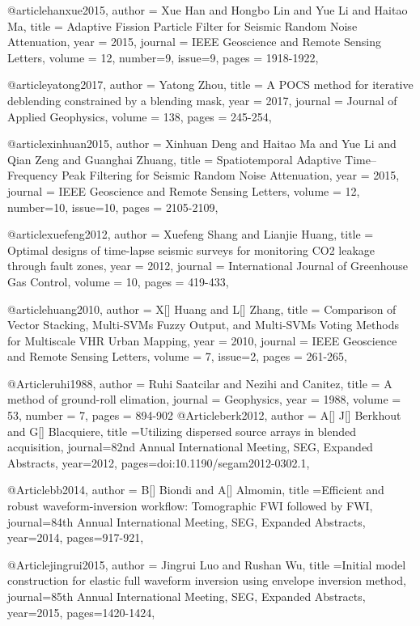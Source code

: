 @article{hanxue2015,
  author =	 {Xue Han and Hongbo Lin and Yue Li and Haitao Ma},
  title =	 {Adaptive Fission Particle Filter for Seismic Random Noise Attenuation},
  year =	 2015,
  journal =	 {IEEE Geoscience and Remote Sensing Letters},
  volume =	 12,
  number=9,
  issue=9,
  pages =	 {1918-1922},
}

@article{yatong2017,
  author =	 {Yatong Zhou},
  title =	 {A {POCS} method for iterative deblending constrained by a blending mask},
  year =	 2017,
  journal =	 {Journal of Applied Geophysics},
  volume =	 138,
  pages =	 {245-254},
}


@article{xinhuan2015,
  author =	 {Xinhuan Deng and Haitao Ma and Yue Li and Qian Zeng and Guanghai Zhuang},
  title =	 {Spatiotemporal Adaptive Time–Frequency Peak Filtering for Seismic Random Noise Attenuation},
  year =	 2015,
  journal =	 {IEEE Geoscience and Remote Sensing Letters},
  volume =	 12,
  number=10,
  issue=10,
  pages =	 {2105-2109},
}

@article{xuefeng2012,
  author =	 {Xuefeng Shang and Lianjie Huang},
  title =	 {Optimal designs of time-lapse seismic surveys for monitoring CO2 leakage
through fault zones},
  year =	 2012,
  journal =	 {International Journal of Greenhouse Gas Control},
  volume =	 10,
  pages =	 {419-433},
}


@article{huang2010,
  author =	 {X[] Huang and L[] Zhang},
  title =	 {Comparison of Vector Stacking, Multi-SVMs Fuzzy Output, and Multi-SVMs Voting Methods for Multiscale VHR Urban Mapping},
  year =	 2010,
  journal =	 {IEEE Geoscience and Remote Sensing Letters},
  volume =	 7,
  issue=2,
  pages =	 {261-265},
}


@Article{ruhi1988,
  author = 	 {Ruhi Saatcilar and Nezihi and Canitez},
  title = 	 {A method of ground-roll elimation},
  journal = 	 {Geophysics},
  year = 	 1988,
  volume = 	 53,
  number = 	 7,
  pages = 	 {894-902}}
@Article{berk2012,
  author = {A[] J[] Berkhout and G[] Blacquiere},
  title ={Utilizing dispersed source arrays in blended acquisition},
  journal={82nd Annual International Meeting, SEG, Expanded Abstracts},
  year=2012,
  pages={doi:10.1190/segam2012-0302.1},
}



@Article{bb2014,
  author = {B[] Biondi and A[] Almomin},
  title ={Efficient and robust waveform-inversion workflow: Tomographic FWI followed by FWI},
  journal={84th Annual International Meeting, SEG, Expanded Abstracts},
  year=2014,
  pages={917-921},
}

@Article{jingrui2015,
  author = {Jingrui Luo and Rushan Wu},
  title ={Initial model construction for elastic full waveform inversion using envelope inversion method},
  journal={85th Annual International Meeting, SEG, Expanded Abstracts},
  year=2015,
  pages={1420-1424},
}

